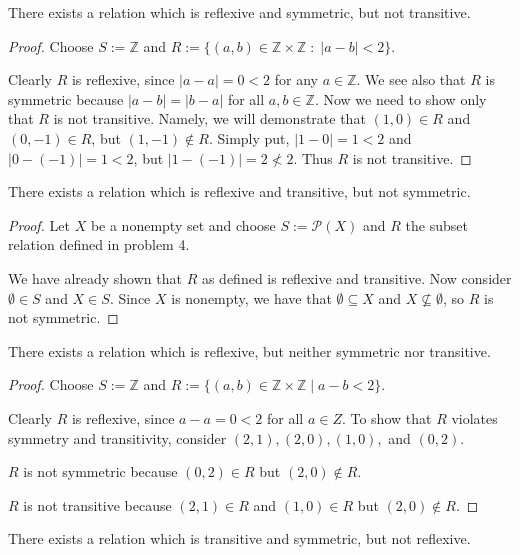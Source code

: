 \documentclass[12pt]{article}
\newcommand{\Z}{\mathbb{Z}}
\newcommand{\Pset}[1]{\mathcal{P}(#1)}
\newenvironment{ex}[2][Problem]{\begin{trivlist}
\item[\hskip \labelsep {\bfseries #1}\hskip \labelsep {\bfseries #2.}]}{\end{trivlist}}
\begin{document}
\begin{ex}{6} [+R+S-T]
    There exists a relation which is reflexive and symmetric, but not transitive.
\end{ex}

\begin{proof}
    Choose $S:=\Z$ and $R:=\{(a, b)\in\Z\times\Z \;:\; |a-b|<2\}$.


    Clearly $R$ is reflexive, since $|a-a| = 0 < 2$ for any $a\in\Z$.
    We see also that $R$ is symmetric because $|a-b|=|b-a|$ for all $a, b\in\Z$.
    Now we need to show only that $R$ is not transitive. Namely,
    we will demonstrate that $(1, 0)\in R$ and $(0, -1)\in R$, but $(1, -1)\notin R$.
    Simply put, $|1-0|=1<2$ and $|0-(-1)| = 1 < 2$, but $|1-(-1)|=2\not<2$.
    Thus $R$ is not transitive.
\end{proof}


\begin{ex}{7} [+R-S+T]
    There exists a relation which is reflexive and transitive, but not symmetric.
\end{ex}

\begin{proof}
    Let $X$ be a nonempty set and choose $S:=\Pset{X}$ and $R$ the subset relation
    defined in problem 4.

    We have already shown that $R$ as defined is reflexive and transitive.
    Now consider $\emptyset\in S$ and $X\in S$. Since $X$ is nonempty, we have
    that $\emptyset\subseteq X$ and $X\not\subseteq\emptyset$, so $R$ is not
    symmetric.
\end{proof}


\begin{ex}{8} [+R-S-T]
    There exists a relation which is reflexive, but neither symmetric nor transitive.
\end{ex}

\begin{proof}
    Choose $S:=\Z$ and $R:=\{(a, b)\in\Z\times\Z \;|\; a-b<2\}$.

    Clearly $R$ is reflexive, since $a-a=0<2$ for all $a\in Z$. To show that
    $R$ violates symmetry and transitivity, consider $(2, 1), (2, 0), (1, 0),$ and $(0,2)$.

    $R$ is not symmetric because $(0, 2)\in R$ but $(2, 0)\notin R$.

    $R$ is not transitive because $(2, 1)\in R$ and $(1, 0)\in R$ but $(2, 0)\notin R$.
\end{proof}


\begin{ex}{9} [-R+S+T]
    There exists a relation which is transitive and symmetric, but not reflexive.
\end{ex}
\end{document}
